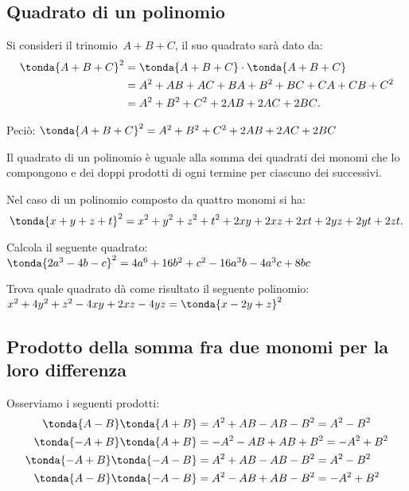 
\subsection{Quadrato di un polinomio}
\label{subsec:11_prodnot_quadratopolinomio}

Si consideri il trinomio~\(A+B+C\), il suo quadrato sarà dato da:
\begin{align*}
\tonda{A+B+C}^{2}&=\tonda{A+B+C}\cdot\tonda{A+B+C}\\
&=A^{2}+{AB}+{AC}+{BA}+B^{2}+{BC}+{CA}+{CB}+C^{2}\\
&=A^{2}+B^{2}+C^{2}+2{AB}+2{AC}+2{BC}.
\end{align*}


Peciò: \quad
\(\tonda{A+B+C}^{2}=A^{2}+B^{2}+C^{2}+2{AB}+2{AC}+2{BC}\)

\osservazione Il quadrato di un polinomio è uguale alla somma
dei quadrati dei monomi che lo compongono e dei doppi prodotti di ogni
termine per ciascuno dei successivi.

Nel caso di un polinomio composto da quattro monomi si ha:
\[\tonda{x+y+z+t}^{2}=x^{2}+y^{2}+z^{2}+t^{2}+2{xy}+2{xz}+2{xt}+2{yz}+2
{yt}+2{zt}.\]

\begin{esempio} Calcola il seguente quadrato:\\
\(\tonda{2a^3-4b-c}^2 = 4a^6 + 16b^2 +c^2 -16a^3 b -4 a^3 c +8 bc\)
\end{esempio}

\begin{esempio} Trova quale quadrato dà come risultato il seguente 
polinomio:\\
\(x^2 + 4y^2 + z^2 -4xy +2xz -4yz = \tonda{x-2y+z}^2\)
\end{esempio}


\subsection{Prodotto della somma fra due monomi per la loro differenza}
\label{subsec:11_prodnot_sommaperdifferenza}

Osserviamo i seguenti prodotti:
\begin{align*}
\tonda{A-B}\tonda{A+B}   &= A^{2}+{AB}-{AB}-B^{2}=A^{2}-B^{2}\\
\tonda{-A+B}\tonda{A+B}  &= -A^{2}-{AB}+{AB}+B^{2}=-A^{2}+B^{2}\\
\tonda{-A+B}\tonda{-A-B} &= A^{2}+{AB}-{AB}-B^{2}=A^{2}-B^{2}\\
\tonda{A-B}\tonda{-A-B}  &= A^{2}-{AB}+{AB}-B^{2}=-A^{2}+B^{2}\\
\end{align*}

